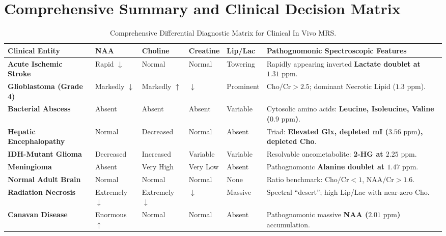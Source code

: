 \documentclass[11pt,a4paper]{article}
\begin{document}
\section{Comprehensive Summary and Clinical Decision Matrix}

\begin{table}[htbp]
\centering
\small
\setlength{\tabcolsep}{2.5pt}
\caption{Comprehensive Differential Diagnostic Matrix for Clinical In Vivo MRS.}
\label{tab:diagnostic_matrix}
\begin{tabular}{p{3.2cm} p{1.6cm} p{1.6cm} p{1.6cm} p{1.6cm} p{4.6cm}}
\toprule
\textbf{Clinical Entity} & \textbf{NAA} & \textbf{Choline} & \textbf{Creatine} & \textbf{Lip/Lac} & \textbf{Pathognomonic Spectroscopic Features} \\
\midrule
\textbf{Acute Ischemic Stroke} & Rapid $\downarrow$ & Normal & Normal & Towering & Rapidly appearing inverted \textbf{Lactate doublet at $1.31\text{ ppm}$}. \\
\addlinespace
\textbf{Glioblastoma (Grade 4)} & Markedly $\downarrow$ & Markedly $\uparrow$ & $\downarrow$ & Prominent & $\text{Cho}/\text{Cr} > 2.5$; dominant Necrotic Lipid ($1.3\text{ ppm}$). \\
\addlinespace
\textbf{Bacterial Abscess} & Absent & Absent & Absent & Variable & Cytosolic amino acids: \textbf{Leucine, Isoleucine, Valine ($0.9\text{ ppm}$)}. \\
\addlinespace
\textbf{Hepatic Encephalopathy} & Normal & Decreased & Normal & Absent & Triad: \textbf{Elevated Glx, depleted mI ($3.56\text{ ppm}$), depleted Cho}. \\
\addlinespace
\textbf{IDH-Mutant Glioma} & Decreased & Increased & Variable & Variable & Resolvable oncometabolite: \textbf{2-HG at $2.25\text{ ppm}$}. \\
\addlinespace
\textbf{Meningioma} & Absent & Very High & Very Low & Absent & Pathognomonic \textbf{Alanine doublet at $1.47\text{ ppm}$}. \\
\addlinespace
\textbf{Normal Adult Brain} & Normal & Normal & Normal & None & Ratio benchmark: $\text{Cho}/\text{Cr} < 1$, $\text{NAA}/\text{Cr} > 1.6$. \\
\addlinespace
\textbf{Radiation Necrosis} & Extremely $\downarrow$ & Extremely $\downarrow$ & $\downarrow$ & Massive & Spectral ``desert''; high Lip/Lac with near-zero Cho. \\
\addlinespace
\textbf{Canavan Disease} & Enormous $\uparrow$ & Normal & Normal & Absent & Pathognomonic massive \textbf{NAA ($2.01\text{ ppm}$)} accumulation. \\
\bottomrule
\end{tabular}
\end{table}
\end{document}
